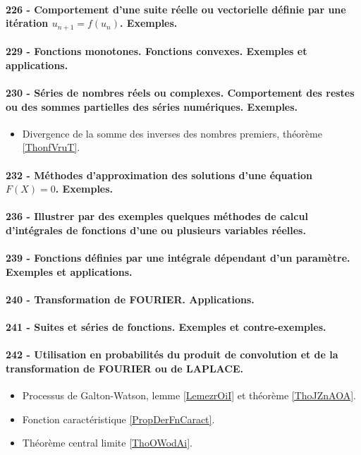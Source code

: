 \paragraph{226 - Comportement d’une suite réelle ou vectorielle définie par une itération \( u_{n+1}=f(u_n)\). Exemples.}
\paragraph{229 - Fonctions monotones. Fonctions convexes. Exemples et applications.}
\paragraph{230 - Séries de nombres réels ou complexes. Comportement des restes ou des sommes partielles des séries numériques. Exemples.}
\begin{itemize}
    \item Divergence de la somme des inverses des nombres premiers, théorème \ref{ThonfVruT}.
\end{itemize}
\paragraph{232 - Méthodes d’approximation des solutions d’une équation $F (X ) = 0$. Exemples.}
\paragraph{236 - Illustrer par des exemples quelques méthodes de calcul d’intégrales de fonctions d’une ou plusieurs variables réelles.}
\paragraph{239 - Fonctions définies par une intégrale dépendant d’un paramètre. Exemples et applications.}
\paragraph{240 - Transformation de FOURIER. Applications.}
\paragraph{241 - Suites et séries de fonctions. Exemples et contre-exemples.}
\paragraph{242 - Utilisation en probabilités du produit de convolution et de la transformation de FOURIER ou de LAPLACE.}
\begin{itemize}
    \item Processus de Galton-Watson, lemme \ref{LemezrOiI} et théorème \ref{ThoJZnAOA}.
    \item Fonction caractéristique \ref{PropDerFnCaract}.
    \item Théorème central limite \ref{ThoOWodAi}.
\end{itemize}

